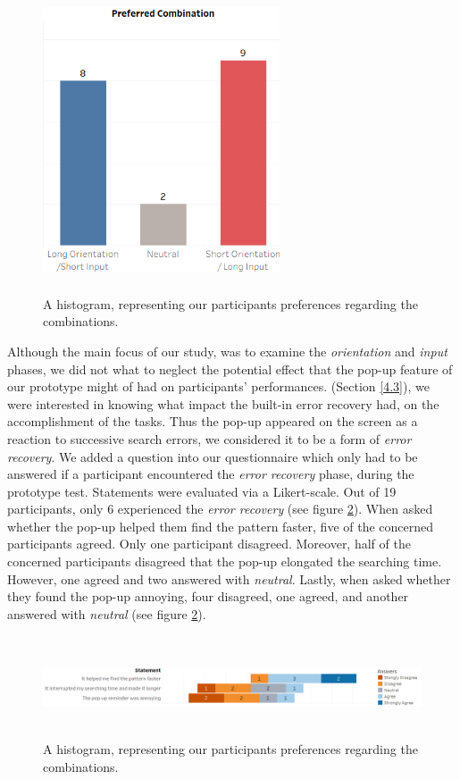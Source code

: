 \begin{figure}[t!]
\centering
\includegraphics[width=7cm, height=9cm]{Chapters/graphics/preference.png}
\caption{A histogram, representing our participants preferences regarding the combinations.}
\label{fig:preference}
\end{figure}

Although the main focus of our study, was to examine the \textit{orientation} and \textit{input} phases, we did not what to neglect the potential effect that the pop-up feature of our prototype might of had on participants' performances. (Section \ref{4.3}), we were interested in knowing what impact the built-in error recovery had, on the accomplishment of the tasks. Thus the pop-up appeared on the screen as a reaction to successive search errors, we considered it to be a form of \textit{error recovery}. We added a question into our questionnaire which only had to be answered if a participant encountered the \textit{error recovery} phase, during the prototype test. Statements were evaluated via a Likert-scale. Out of 19 participants, only 6 experienced the \textit{error recovery} (see figure \ref{fig:error}). When asked whether the pop-up helped them find the pattern faster, five of the concerned participants agreed. Only one participant disagreed. Moreover, half of the concerned participants disagreed that the pop-up elongated the searching time. However, one agreed and two answered with \textit{neutral}. Lastly, when asked whether they found the pop-up annoying, four disagreed, one agreed, and another answered with \textit{neutral} (see figure \ref{fig:error}). \\


\begin{figure}[t!]
\centering
\includegraphics[width=15cm, height=3cm]{Chapters/graphics/ErrorRecovery.png}
\caption{A histogram, representing our participants preferences regarding the combinations.}
\label{fig:error}
\end{figure}





